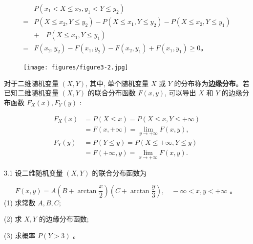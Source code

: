 \documentclass{beamer}
\begin{document}
	\begin{frame}
	$$
	\begin{aligned}
		& P\left(x_{1}<X \leqslant x_{2}, y_{1}<Y \leqslant y_{2}\right) \\
		= & P\left(X \leqslant x_{2}, Y \leqslant y_{2}\right)-P\left(X \leqslant x_{1}, Y \leqslant y_{2}\right)-P\left(X \leqslant x_{2}, Y \leqslant y_{1}\right) \\ 
		& + \quad P\left(X \leqslant x_{1}, Y \leqslant y_{1}\right) \\
		= & F\left(x_{2}, y_{2}\right)-F\left(x_{1}, y_{2}\right)-F\left(x_{2}, y_{1}\right)+F\left(x_{1}, y_{1}\right) \geqslant 0 。
	\end{aligned}
	$$
	\begin{figure}
		\centering
		\texttt{[image: figures/figure3-2.jpg]}
	\end{figure}
	\end{frame}
	
	\begin{frame}
		对于二维随机变量 $(X, Y)$, 其中, 单个随机变量 $X$ 或 $Y$ 的分布称为\textbf{边缘分布}。若 已知二维随机变量 $(X, Y)$ 的联合分布函数 $F(x, y)$, 可以导出 $X$ 和 $Y$ 的边缘分布函数 $F_{X}(x), F_{Y}(y)$ :
		
		$$
		\begin{aligned}
			F_{X}(x) & =P(X \leqslant x)=P(X \leqslant x, Y \leqslant+\infty) \\
			& =F(x,+\infty)=\lim _{y \rightarrow+\infty} F(x, y), \\
			F_{Y}(y) & =P(Y \leqslant y)=P(X \leqslant+\infty, Y \leqslant y) \\
			& =F(+\infty, y)=\lim _{x \rightarrow+\infty} F(x, y) .
		\end{aligned}
		$$
	\end{frame}
	 
	\begin{frame}
		3.1 设二维随机变量 $(X, Y)$ 的联合分布函数为
		
		$$
		F(x, y)=A\left(B+\arctan \frac{x}{2}\right)\left(C+\arctan \frac{y}{3}\right), \quad-\infty<x, y<+\infty \text { 。 }
		$$
		(1) 求常数 $A, B, C$; 
		
		(2) 求 $X, Y$ 的边缘分布函数;
		
		(3) 求概率 $P(Y>3)$ 。
	\end{frame}
	
\end{document}
